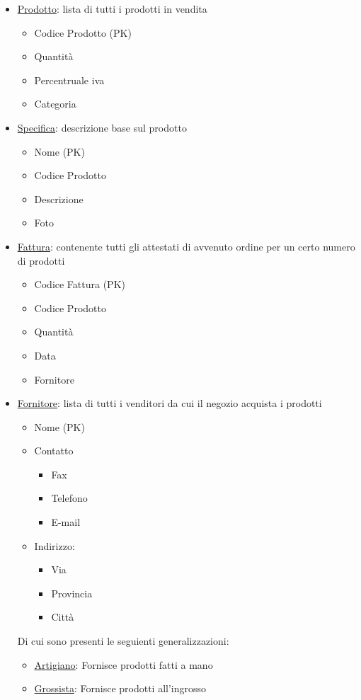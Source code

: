 \begin{itemize}
\item \underline{Prodotto}: lista di tutti i prodotti in vendita
  \begin{itemize}
  \item Codice Prodotto (PK)
  \item Quantit\`a
  \item Percentruale iva
  \item Categoria
  \end{itemize}

\item \underline{Specifica}: descrizione base sul prodotto
  \begin{itemize}
  \item Nome (PK)
  \item Codice Prodotto
  \item Descrizione
  \item Foto
  \end{itemize}

\item \underline{Fattura}: contenente tutti gli attestati di avvenuto ordine per un certo numero di prodotti
  \begin{itemize}
  \item Codice Fattura (PK)
  \item Codice Prodotto
  \item Quantit\`a
  \item Data
  \item Fornitore
  \end{itemize}

\item \underline{Fornitore}: lista di tutti i venditori da cui il negozio acquista i prodotti
  \begin{itemize}
  \item Nome (PK)
  \item Contatto
    \begin{itemize}
    \item Fax
    \item Telefono
    \item E-mail
    \end{itemize}

  \item Indirizzo:
    \begin{itemize}
    \item Via
    \item Provincia
    \item Citt\`a
    \end{itemize}
  \end{itemize}
  Di cui sono presenti le seguienti generalizzazioni:
  \begin{itemize}
  \item \underline{Artigiano}: Fornisce prodotti fatti a mano
  \item \underline{Grossista}: Fornisce prodotti all'ingrosso
  \end{itemize}


\end{itemize}
